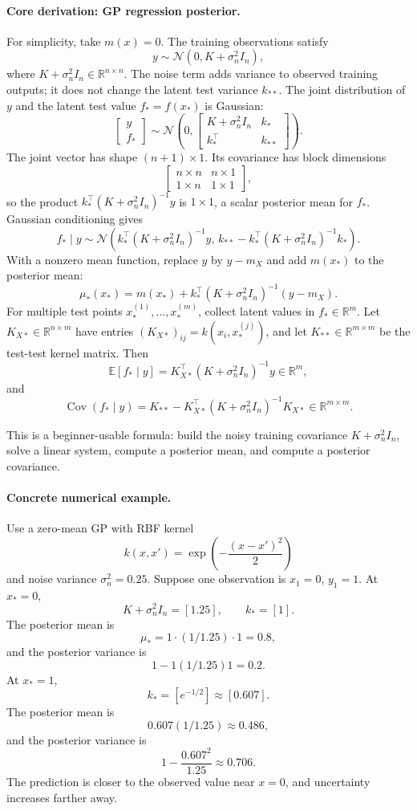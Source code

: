 \paragraph{Core derivation: GP regression posterior.}
For simplicity, take \(m(x)=0\). The training observations satisfy
\[
y\sim\mathcal N(0,K+\sigma_n^2 I_n),
\]
where \(K+\sigma_n^2 I_n\in\mathbb R^{n\times n}\). The noise term adds variance to observed training outputs; it does not change the latent test variance \(k_{**}\).
The joint distribution of \(y\) and the latent test value \(f_*=f(x_*)\) is Gaussian:
\[
\begin{bmatrix}
y\\
f_*
\end{bmatrix}
\sim
\mathcal N
\left(
0,
\begin{bmatrix}
K+\sigma_n^2 I_n & k_*\\
k_*^\top & k_{**}
\end{bmatrix}
\right).
\]
The joint vector has shape \((n+1)\times1\). Its covariance has block dimensions
\[
\begin{bmatrix}
n\times n & n\times1\\
1\times n & 1\times1
\end{bmatrix},
\]
so the product \(k_*^\top(K+\sigma_n^2 I_n)^{-1}y\) is \(1\times1\), a scalar posterior mean for \(f_*\).
Gaussian conditioning gives
\[
\boxed{
f_*\mid y
\sim
\mathcal N
\left(
k_*^\top(K+\sigma_n^2 I_n)^{-1}y,\,
k_{**}-k_*^\top(K+\sigma_n^2 I_n)^{-1}k_*
\right).
}
\]
With a nonzero mean function, replace \(y\) by \(y-m_X\) and add \(m(x_*)\) to the posterior mean:
\[
\mu_*(x_*)=m(x_*)+k_*^\top(K+\sigma_n^2 I_n)^{-1}(y-m_X).
\]
For multiple test points \(x_*^{(1)},\ldots,x_*^{(m)}\), collect latent values in \(f_*\in\mathbb R^m\). Let \(K_{X*}\in\mathbb R^{n\times m}\) have entries \((K_{X*})_{ij}=k(x_i,x_*^{(j)})\), and let \(K_{**}\in\mathbb R^{m\times m}\) be the test-test kernel matrix. Then
\[
\mathbb E[f_*\mid y]=K_{X*}^\top(K+\sigma_n^2 I_n)^{-1}y\in\mathbb R^m,
\]
and
\[
\operatorname{Cov}(f_*\mid y)=K_{**}-K_{X*}^\top(K+\sigma_n^2 I_n)^{-1}K_{X*}\in\mathbb R^{m\times m}.
\]

This is a beginner-usable formula: build the noisy training covariance \(K+\sigma_n^2 I_n\), solve a linear system, compute a posterior mean, and compute a posterior covariance.

\paragraph{Concrete numerical example.}
Use a zero-mean GP with RBF kernel
\[
k(x,x')=\exp\left(-\frac{(x-x')^2}{2}\right)
\]
and noise variance \(\sigma_n^2=0.25\). Suppose one observation is \(x_1=0\), \(y_1=1\). At \(x_*=0\),
\[
K+\sigma_n^2 I_n=[1.25],\qquad k_*=[1].
\]
The posterior mean is
\[
\mu_*=1\cdot(1/1.25)\cdot1=0.8,
\]
and the posterior variance is
\[
1-1(1/1.25)1=0.2.
\]
At \(x_*=1\),
\[
k_*=[e^{-1/2}]\approx[0.607].
\]
The posterior mean is
\[
0.607(1/1.25)\approx0.486,
\]
and the posterior variance is
\[
1-\frac{0.607^2}{1.25}\approx0.706.
\]
The prediction is closer to the observed value near \(x=0\), and uncertainty increases farther away.

